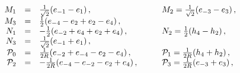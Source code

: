 \begin{equation}\label{lulymo3.14}
\begin{array}{rlll}
M_1 &=&  \frac{1}{\sqrt{2}}(e_{-1} - e_1) \, , \qquad
&
 M_2 = \frac{1}{\sqrt{2}}(e_{-3} - e_3) \, ,
\cr
M_3 &=&   \frac{1}{{2}}(e_{-4} - e_2 + e_2 - e_4) \, ,
&
\cr
N_1 &=& - \frac{1}{{2}}(e_{-2} + e_4 + e_2 + e_4) \, ,
\qquad
&
N_2 =  \frac{1}{{2}}(h_{4} - h_2) \, ,
\cr
N_3 &=&  \frac{1}{\sqrt{2}}(e_{-1} + e_1) \, ,
&
\cr
{\cal P}_0 &=&  \frac{1}{{2R}}(e_{-2} + e_{-4} - e_2 - e_4) \, ,
\qquad
&
{\cal P}_1 = \frac{1}{{2R}}(h_{4} + h_{2} ) \, ,
\cr
{\cal P}_2 &=&  -\frac{1}{{2R}}(e_{-4} - e_{-2} - e_2 + e_4) \, ,
\qquad
&
{\cal P}_3 = \frac{1}{{2R}}(e_{-3} + e_{3} ) \, ,
\end{array}
\end{equation}

